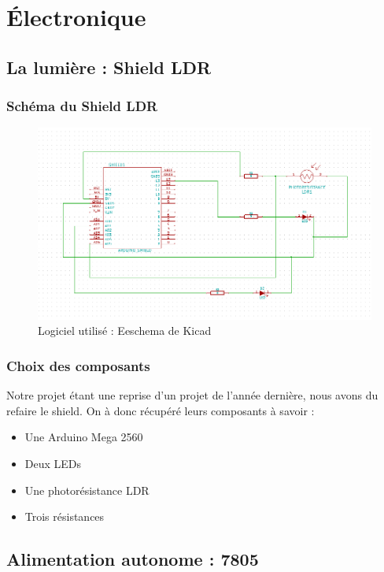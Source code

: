 \chapter{Électronique}
\section{La lumière : Shield LDR}
\subsection{Schéma du Shield LDR}
\begin{figure}[h]
	\centering
	\includegraphics[width=550px]{images/SchemaElectriqueShield.png}
	\caption{Logiciel utilisé : Eeschema de Kicad}
\end{figure}

\subsection{Choix des composants} 
	Notre projet étant une reprise d'un projet de l'année dernière, nous avons du refaire le shield. On à donc récupéré leurs composants à savoir :
	\begin{itemize}
		\item Une Arduino Mega 2560
		\item Deux LEDs 
		\item Une photorésistance LDR
		\item Trois résistances
	\end{itemize}

\section{Alimentation autonome : 7805}
